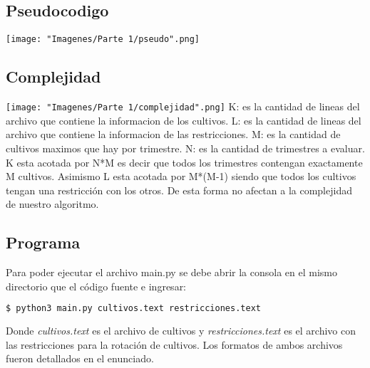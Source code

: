 \subsection{Pseudocodigo}
\texttt{[image: "Imagenes/Parte 1/pseudo".png]}\newline

\subsection{Complejidad}
\texttt{[image: "Imagenes/Parte 1/complejidad".png]}\newline
K: es la cantidad de lineas del archivo que contiene la informacion de los cultivos.\newline
L: es la cantidad de lineas del archivo que contiene la informacion de las restricciones.\newline
M: es la cantidad de cultivos maximos que hay por trimestre.\newline
N: es la cantidad de trimestres a evaluar.\newline
K esta acotada por N*M es decir que todos los trimestres contengan exactamente M cultivos. Asimismo L esta acotada por M*(M-1) siendo que todos los cultivos tengan una restricción con los otros.\newline
De esta forma no afectan a la complejidad de nuestro algoritmo.

\subsection{Programa}
Para poder ejecutar el archivo main.py se debe abrir la consola en el mismo directorio que el código fuente e ingresar:
\begin{lstlisting}[language=bash]
  $ python3 main.py cultivos.text restricciones.text
\end{lstlisting}
Donde \emph {cultivos.text} es el archivo de cultivos y \emph{restricciones.text} es el archivo con las restricciones para la rotación de cultivos. Los formatos de ambos archivos fueron detallados en el enunciado. \newline
